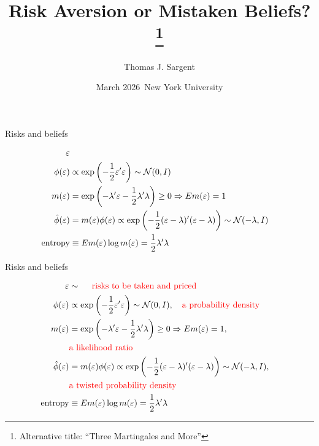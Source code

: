 \documentclass{beamer}
\title{Risk Aversion or Mistaken  Beliefs?\footnote{Alternative title: ``Three Martingales and More''}
} %
\author{Thomas J. Sargent }
\date{March 2026\ {\small  New York University}}
\theoremstyle{Definition}
\begin{document}
\begin{frame}
\titlepage
\end{frame}



\begin{frame}{Risks and beliefs}


 \begin{align*}
         \varepsilon & \cr
         \phi(\varepsilon) & \propto \exp\left(- \frac{1}{2} \varepsilon' \varepsilon\right) \sim {\mathcal N}(0,I) \cr
         m(\varepsilon) &  = \exp \left( -\lambda' \varepsilon - \frac{1}{2} \lambda' \lambda \right) \geq 0  \Rightarrow 
     E m(\varepsilon)  = 1 \cr
    \hat \phi(\varepsilon)  & =  m(\varepsilon) \phi(\varepsilon)  \propto \exp\left( - \frac{1}{2} (\varepsilon - \lambda)'(\varepsilon - \lambda)\right)  \sim {\mathcal N}(-\lambda, I) \cr
               \textrm{entropy} & \equiv  E m(\varepsilon) \log m (\varepsilon) = \frac{1}{2} \lambda'\lambda
        \end{align*}
%

%
\end{frame}



\begin{frame}{Risks and beliefs}


 \begin{align*}
         \varepsilon & \sim \quad {\color{red}{\textrm{ risks to be taken and priced}}} \cr
         \phi(\varepsilon) & \propto \exp\left(- \frac{1}{2} \varepsilon' \varepsilon\right) \sim {\mathcal N}(0,I) , \quad  {\color{red}{\textrm {a probability density}}} \cr
         m(\varepsilon) &  = \exp \left( -\lambda' \varepsilon - \frac{1}{2} \lambda' \lambda \right) \geq 0  \Rightarrow 
     E m(\varepsilon)  = 1 , \cr
      &  {\color{red}{\textrm {a likelihood ratio}}}  \cr
    \hat \phi(\varepsilon)  & =  m(\varepsilon) \phi(\varepsilon)  \propto \exp\left( - \frac{1}{2} (\varepsilon - \lambda)'(\varepsilon - \lambda)\right)  \sim {\mathcal N}(-\lambda, I) , \cr
    &  {\color{red}{\textrm {a twisted probability density}}}  \cr
               \textrm{entropy} & \equiv  E m(\varepsilon) \log m (\varepsilon) = \frac{1}{2} \lambda'\lambda
        \end{align*}
%

%
\end{frame}
\end{document}
